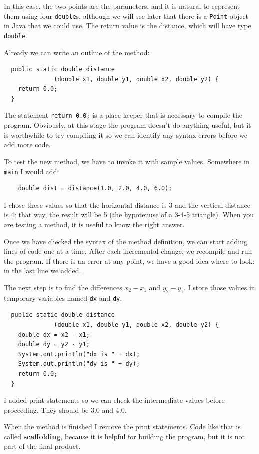 \documentclass[12pt]{book}
\theoremstyle{exercise}
\begin{document}
In this case, the two points are the parameters, and it is
natural to represent them using four {\tt double}s, although
we will see later that there is a {\tt Point} object in Java
that we could use.  The return value is the distance, which
will have type {\tt double}.

Already we can write an outline of the method:

\begin{lstlisting}
  public static double distance
              (double x1, double y1, double x2, double y2) {
    return 0.0;
  }
\end{lstlisting}
%
The statement {\tt return 0.0;} is a place-keeper that is necessary
to compile the program.  Obviously, at this stage the
program doesn't do anything useful, but it is worthwhile to
try compiling it so we can identify any syntax errors before
we add more code.

To test the new method, we have to invoke it with
sample values.  Somewhere in {\tt main} I would add:

\begin{lstlisting}
    double dist = distance(1.0, 2.0, 4.0, 6.0);
\end{lstlisting}
%
I chose these values so that the horizontal
distance is 3 and the vertical distance is 4; that way,
the result will be 5 (the hypotenuse of a 3-4-5 triangle).
When you are testing a method, it is useful to know the right
answer.

Once we have checked the syntax of the method definition, we
can start adding lines of code one at a time.  After each
incremental change, we recompile and run the program.  If there is
an error at any point, we have a good idea where to look:
in the last line we added.

The next step is to find the differences
$x_2 - x_1$ and $y_2 - y_1$.  I store those values in
temporary variables named {\tt dx} and {\tt dy}.

\begin{lstlisting}
  public static double distance
              (double x1, double y1, double x2, double y2) {
    double dx = x2 - x1;
    double dy = y2 - y1;
    System.out.println("dx is " + dx);
    System.out.println("dy is " + dy);
    return 0.0;
  }
\end{lstlisting}
%
I added print statements so we can check the intermediate values
before proceeding.  They should be 3.0 and 4.0.


When the method is finished I remove the print statements.  Code
like that is called {\bf scaffolding}, because it is helpful for
building the program, but it is not part of the final product.
\end{document}
